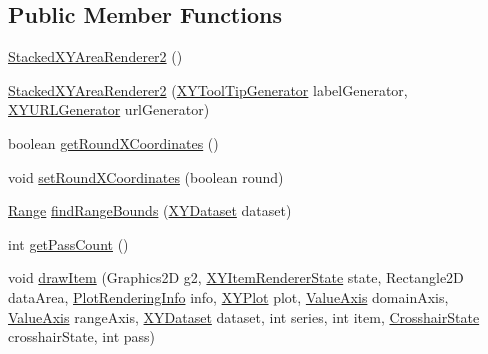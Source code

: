 \subsection*{Public Member Functions}
\begin{DoxyCompactItemize}
\item 
\mbox{\hyperlink{classorg_1_1jfree_1_1chart_1_1renderer_1_1xy_1_1_stacked_x_y_area_renderer2_a3969b14d74ff901bbede121e06dc81c2}{Stacked\+X\+Y\+Area\+Renderer2}} ()
\item 
\mbox{\hyperlink{classorg_1_1jfree_1_1chart_1_1renderer_1_1xy_1_1_stacked_x_y_area_renderer2_ad6a606518a66c08ab29260b6af4cafc4}{Stacked\+X\+Y\+Area\+Renderer2}} (\mbox{\hyperlink{interfaceorg_1_1jfree_1_1chart_1_1labels_1_1_x_y_tool_tip_generator}{X\+Y\+Tool\+Tip\+Generator}} label\+Generator, \mbox{\hyperlink{interfaceorg_1_1jfree_1_1chart_1_1urls_1_1_x_y_u_r_l_generator}{X\+Y\+U\+R\+L\+Generator}} url\+Generator)
\item 
boolean \mbox{\hyperlink{classorg_1_1jfree_1_1chart_1_1renderer_1_1xy_1_1_stacked_x_y_area_renderer2_ae89c0a904ba6f253d83ee8c642f76119}{get\+Round\+X\+Coordinates}} ()
\item 
void \mbox{\hyperlink{classorg_1_1jfree_1_1chart_1_1renderer_1_1xy_1_1_stacked_x_y_area_renderer2_a9f673a482a834df86902e80688814c93}{set\+Round\+X\+Coordinates}} (boolean round)
\item 
\mbox{\hyperlink{classorg_1_1jfree_1_1data_1_1_range}{Range}} \mbox{\hyperlink{classorg_1_1jfree_1_1chart_1_1renderer_1_1xy_1_1_stacked_x_y_area_renderer2_aedbc0b86088deae5df4c43dca22d8bc3}{find\+Range\+Bounds}} (\mbox{\hyperlink{interfaceorg_1_1jfree_1_1data_1_1xy_1_1_x_y_dataset}{X\+Y\+Dataset}} dataset)
\item 
int \mbox{\hyperlink{classorg_1_1jfree_1_1chart_1_1renderer_1_1xy_1_1_stacked_x_y_area_renderer2_aef69f925cb2e64313b5ddfa58ec6e09f}{get\+Pass\+Count}} ()
\item 
void \mbox{\hyperlink{classorg_1_1jfree_1_1chart_1_1renderer_1_1xy_1_1_stacked_x_y_area_renderer2_af0feef5e61eac8d17f50d5ba1e4b9c89}{draw\+Item}} (Graphics2D g2, \mbox{\hyperlink{classorg_1_1jfree_1_1chart_1_1renderer_1_1xy_1_1_x_y_item_renderer_state}{X\+Y\+Item\+Renderer\+State}} state, Rectangle2D data\+Area, \mbox{\hyperlink{classorg_1_1jfree_1_1chart_1_1plot_1_1_plot_rendering_info}{Plot\+Rendering\+Info}} info, \mbox{\hyperlink{classorg_1_1jfree_1_1chart_1_1plot_1_1_x_y_plot}{X\+Y\+Plot}} plot, \mbox{\hyperlink{classorg_1_1jfree_1_1chart_1_1axis_1_1_value_axis}{Value\+Axis}} domain\+Axis, \mbox{\hyperlink{classorg_1_1jfree_1_1chart_1_1axis_1_1_value_axis}{Value\+Axis}} range\+Axis, \mbox{\hyperlink{interfaceorg_1_1jfree_1_1data_1_1xy_1_1_x_y_dataset}{X\+Y\+Dataset}} dataset, int series, int item, \mbox{\hyperlink{classorg_1_1jfree_1_1chart_1_1plot_1_1_crosshair_state}{Crosshair\+State}} crosshair\+State, int pass)

\end{DoxyCompactItemize}
